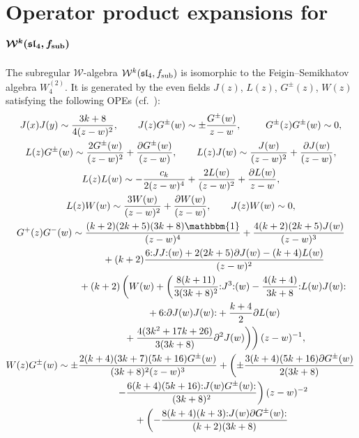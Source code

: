 \documentclass[pdftex]{sigma}
\numberwithin{equation}{section}
\begin{document}
 \section[Operator product expansions for W\^{}k(sl\_4, f\_sub)]{Operator product expansions for $\boldsymbol{\mathcal{W}^{k}(\mathfrak{sl}_4, f_{\rm sub})}$}
 \label{appendix-b}

 The subregular $\mathcal{W}$-algebra $\mathcal{W}^{k}(\mathfrak{sl}_4, f_{\rm sub})$ is isomorphic to the Feigin--Semikhatov algebra $W^{(2)}_4$. It is generated by the even fields $J(z)$, $L(z)$, $G^{\pm}(z)$, $W(z)$ satisfying the following OPEs (cf.~\cite{FS}):
 \begin{gather*}
 J(x)J(y) \sim \frac{3k+8}{4(z-w)^{2}}, \qquad
 J(z)G^{\pm}(w) \sim \pm \frac{G^{\pm}(w)}{z-w} , \enskip \qquad G^{\pm}(z)G^{\pm}(w) \sim0, \\
	L(z)G^{\pm}(w) \sim \frac{2G^{\pm}(w)}{(z-w)^{2}} + \frac{\partial G^{\pm}(w)}{(z-w)}, \qquad
	L(z)J(w) \sim \frac{J(w)}{(z-w)^{2}} + \frac{\partial J(w)}{(z-w)}, \\
	L(z)L(w) \sim - \frac{c_k}{2(z-w)^{4}}+ \frac{2L(w)}{(z-w)^{2}}+ \frac{\partial L(w)}{z-w}, \\
	L(z) W(w) \sim \frac{3 W(w)}{(z-w)^{2}} + \frac{ \partial W(w)}{(z-w)}, \qquad J(z) W(w) \sim 0,
\\
	G^+(z)G^-(w) \sim \frac{(k+2)(2k+5)(3k+8)\mathbbm{1}}{(z-w)^{4}}+ \frac{4(k+2)(2k+5)J(w)}{ (z-w)^{3}} \\
	\phantom{	G^+(z)G^-(w) \sim }{} + (k+2) \frac{6 {:}JJ{:}(w) +2(2k+5)\partial J(w)-(k+4)L(w)}{(z-w)^{2}} \\
		\phantom{	G^+(z)G^-(w) \sim }{} + (k+2)\left( W(w) + \left(\frac{8(k+11)}{3(3k+8)^2}{:}J^3{:}(w)-\frac{4(k+4)}{3k+8}{:}L(w)J(w){:}\right.\right.\\
\left.\left.\phantom{	G^+(z)G^-(w) \sim }{}+ 6{:}\partial J(w)J(w){:}	 + \frac{k+4}{2}\partial L(w)\right.\right. \\
\left.\left.\phantom{	G^+(z)G^-(w) \sim }{}+ \frac{4(3k^2+17k+26)}{3(3k+8)}\partial ^2J(w)\right)\right)(z-w)^{-1},
\\
	 W(z)G^{\pm}(w) \sim \pm\frac{2(k+4)(3k+7)(5k+16)G^{\pm}(w)}{(3k+8)^2(z-w)^{3}}+ \left(\pm\frac{3(k+4)(5k+16)\partial G^{\pm}(w)}{2(3k+8)} \right. \\
\phantom{ W(z)G^{\pm}(w) \sim }{}	 \left. -\frac{6(k+4)(5k+16){:}J(w)G^{\pm}(w){:} }{(3k+8)^2}\right)(z-w)^{-2} \\
\phantom{ W(z)G^{\pm}(w) \sim }{}+\left(-\frac{8(k+4)(k+3){:}J(w)\partial G^{\pm}(w){:}}{(k+2)(3k+8)} \right. \\

\end{gather*}
\end{document}
